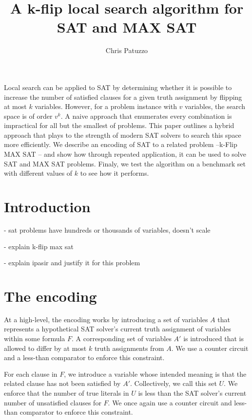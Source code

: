 \documentclass{article}
\begin{document}
\title{A k-flip local search algorithm for SAT and MAX SAT}
\author{Chris Patuzzo}
\maketitle

\abstract
Local search can be applied to SAT by determining whether it is possible to
increase the number of satisfied clauses for a given truth assignment by
flipping at most $k$ variables. However, for a problem instance with $v$
variables, the search space is of order $v^k$. A naive approach that enumerates
every combination is impractical for all but the smallest of problems. This
paper outlines a hybrid approach that plays to the strength of modern SAT
solvers to search this space more efficiently. We describe an encoding of SAT
to a related problem –\linebreak k-Flip MAX SAT – and show how through repeated
application, it can be used to solve SAT and MAX SAT problems. Finaly, we test
the algorithm on a benchmark set with different values of $k$ to see how it
performs.

\section{Introduction}
- sat problems have hundreds or thousands of variables, doesn't scale

- explain k-flip max sat

- explain ipasir and justify it for this problem

\section{The encoding}

At a high-level, the encoding works by introducing a set of variables $A$ that
represents a hypothetical SAT solver's current truth assignment of variables
within some formula $F$. A corresponding set of variables $A'$ is introduced
that is allowed to differ by at most $k$ truth assignments from $A$.  We use a
counter circuit and a less-than comparator to enforce this constraint.

For each clause in $F$, we introduce a variable whose intended meaning is that
the related clause has not been satisfied by $A'$. Collectively, we call this
set $U$. We enforce that the number of true literals in $U$ is less than the
SAT solver's current number of unsatisfied clauses for $F$. We once again use a
counter circuit and less-than comparator to enforce this constraint.
\end{document}
